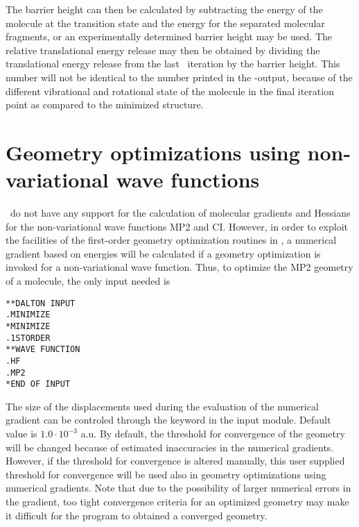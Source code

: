 The barrier height can then be calculated by subtracting the energy of
the molecule at the transition state and the energy for the separated
molecular fragments, or an experimentally determined barrier height
may be used. The relative translational energy release may then be
obtained  by dividing the translational energy release
from the last \siraba\ iteration by the barrier height. This number will
not be identical to the number printed in the \siraba -output, because
of the different vibrational and rotational state of
the molecule in the final iteration point as compared to the minimized
structure.

\section{Geometry optimizations using non-variational wave
functions}\label{sec:nonvargeom}

\siraba\ do not have any support for the calculation of molecular
gradients and Hessians for the non-variational wave functions MP2 and
CI. However, in order to 
exploit the facilities of the first-order 
geometry optimization routines in \siraba , a numerical
gradient based
on energies will be calculated if a geometry optimization is invoked
for a non-variational wave function. Thus, to optimize the MP2
geometry of a molecule, the only input needed is

\begin{verbatim}
**DALTON INPUT
.MINIMIZE
*MINIMIZE
.1STORDER
**WAVE FUNCTION
.HF
.MP2
*END OF INPUT
\end{verbatim}

The size of the displacements used during the evaluation of the
numerical gradient can be controled through the keyword 
in the  input module. Default value is $1.0\cdot 10^{-3}$
a.u. By default, the threshold for convergence of the geometry will be
changed because of estimated inaccuracies in the numerical
gradients. However, if the threshold for convergence is altered
manually, this user supplied threshold for convergence will be used
also in geometry optimizations using numerical
gradients. Note that
due to the possibility of larger numerical errors in the gradient, too
tight convergence criteria for an optimized geometry may make it
difficult for the program to obtained a converged geometry.
